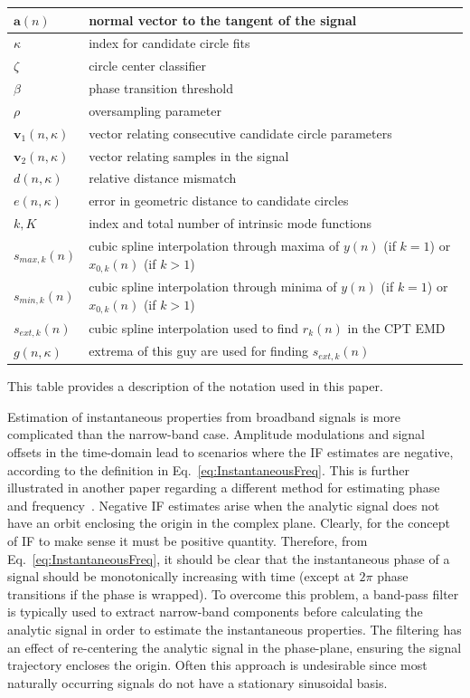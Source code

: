 \documentclass[a4paper]{IEEEtran}
\begin{document}
\begin{table}[!ht]
\begin{tabular}{|l|l|}
	$\mathbf{a}(n)$ & normal vector to the tangent of the signal \\ \hline
	$\kappa$ & index for candidate circle fits \\ \hline
	$\zeta$ & circle center classifier \\ \hline
	$\beta$ & phase transition threshold \\ \hline 
	$\rho$ & oversampling parameter \\ \hline
	$\mathbf{v}_1(n,\kappa)$ & vector relating consecutive candidate circle parameters \\ \hline
	$\mathbf{v}_2(n,\kappa)$ & vector relating samples in the signal\\ \hline
	$d(n,\kappa)$ & relative distance mismatch \\ \hline
	$e(n,\kappa)$ & error in geometric distance to candidate circles \\ \hline
	$k,K$ & index and total number of intrinsic mode functions \\ \hline
	$s_{max,k}(n)$ & cubic spline interpolation through maxima of $y(n)$ (if $k=1$) or $x_{0,k}(n)$ (if $k>1$) \\ \hline
	$s_{min,k}(n)$ & cubic spline interpolation through minima of $y(n)$ (if $k=1$) or $x_{0,k}(n)$ (if $k>1$) \\ \hline
	$s_{ext,k}(n)$ & cubic spline interpolation used to find $r_k(n)$ in the CPT EMD \\ \hline
	$g(n,\kappa)$ & extrema of this guy are used for finding $s_{ext,k}(n)$ \\ \hline 
\end{tabular}
\begin{flushleft}This table provides a description of the notation used in this paper.
\end{flushleft}
\label{tab:Notation}
\end{table}

Estimation of instantaneous properties from broadband signals is more complicated than the narrow-band case. Amplitude modulations and signal offsets in the time-domain lead to scenarios where the IF estimates are negative, according to the definition in Eq.~\ref{eq:InstantaneousFreq}. This is further illustrated in another paper regarding a different method for estimating phase and frequency~\cite{Huang1998}. Negative IF estimates arise when the analytic signal does not have an orbit enclosing the origin in the complex plane. Clearly, for the concept of IF to make sense it must be positive quantity. Therefore, from Eq.~\ref{eq:InstantaneousFreq}, it should be clear that the instantaneous phase of a signal should be monotonically increasing with time (except at $2\pi$ phase transitions if the phase is wrapped). To overcome this problem, a band-pass filter is typically used to extract narrow-band components before calculating the analytic signal in order to estimate the instantaneous properties. The filtering has an effect of re-centering the analytic signal in the phase-plane, ensuring the signal trajectory encloses the origin. Often this approach is undesirable since most naturally occurring signals do not have a stationary sinusoidal basis. 
\end{document}
